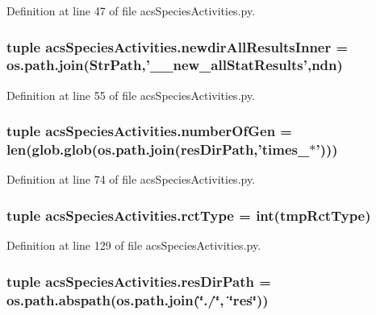 Definition at line 47 of file acs\-Species\-Activities.\-py.

\hypertarget{a00103_ae77a5ce35739a29f29f9df698d91f1c9}{
\subsubsection[{newdir\-All\-Results\-Inner}]{\setlength{\rightskip}{0pt plus 5cm}tuple acs\-Species\-Activities.\-newdir\-All\-Results\-Inner = os.\-path.\-join({\bf Str\-Path},'\-\_\-\_\-new\-\_\-all\-Stat\-Results',{\bf ndn})}}\label{a00103_ae77a5ce35739a29f29f9df698d91f1c9}


Definition at line 55 of file acs\-Species\-Activities.\-py.

\hypertarget{a00103_acceae37ca98ccf6dc25c9f538fda386f}{
\subsubsection[{number\-Of\-Gen}]{\setlength{\rightskip}{0pt plus 5cm}tuple acs\-Species\-Activities.\-number\-Of\-Gen = len(glob.\-glob(os.\-path.\-join({\bf res\-Dir\-Path},'times\-\_\-$\ast$')))}}\label{a00103_acceae37ca98ccf6dc25c9f538fda386f}


Definition at line 74 of file acs\-Species\-Activities.\-py.

\hypertarget{a00103_abdc37f53b75138949fbbe9f9e42f1e6f}{
\subsubsection[{rct\-Type}]{\setlength{\rightskip}{0pt plus 5cm}tuple acs\-Species\-Activities.\-rct\-Type = int(tmp\-Rct\-Type)}}\label{a00103_abdc37f53b75138949fbbe9f9e42f1e6f}


Definition at line 129 of file acs\-Species\-Activities.\-py.

\hypertarget{a00103_a2c1728d3ec9815ec7cf41653e953524c}{
\subsubsection[{res\-Dir\-Path}]{\setlength{\rightskip}{0pt plus 5cm}tuple acs\-Species\-Activities.\-res\-Dir\-Path = os.\-path.\-abspath(os.\-path.\-join(\char`\"{}./\char`\"{}, \char`\"{}res\char`\"{}))}}\label{a00103_a2c1728d3ec9815ec7cf41653e953524c}


